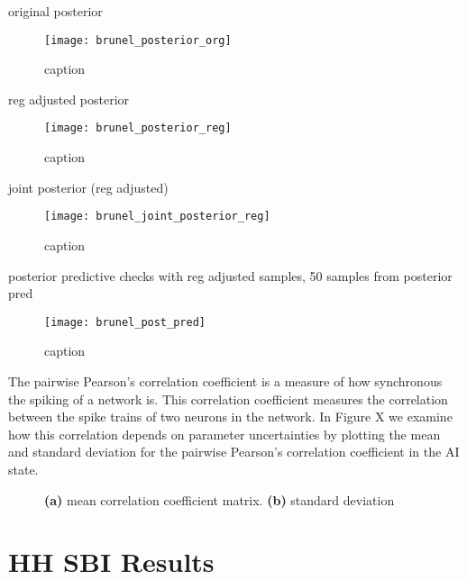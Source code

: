 original posterior

\begin{figure}[H]
    \centering
    \texttt{[image: brunel\_posterior\_org]}
    \caption{caption}
    \label{fig:fig1}
\end{figure}

reg adjusted posterior

\begin{figure}[H]
    \centering
    \texttt{[image: brunel\_posterior\_reg]}
    \caption{caption}
    \label{fig:fig1}
\end{figure}


joint posterior (reg adjusted)

\begin{figure}[H]
    \centering
    \texttt{[image: brunel\_joint\_posterior\_reg]}
    \caption{caption}
    \label{fig:fig1}
\end{figure}

posterior predictive checks with reg adjusted samples, 50 samples from posterior pred

\begin{figure}[H]
    \centering
    \texttt{[image: brunel\_post\_pred]}
    \caption{caption}
    \label{fig:fig1}
\end{figure}

The pairwise Pearson's correlation coefficient is a measure of how synchronous the spiking of a network is. This correlation coefficient measures the correlation between the spike trains of two neurons in the network. In Figure X we examine how this correlation depends on parameter uncertainties by plotting the mean and standard deviation for the pairwise Pearson's correlation coefficient in the AI state.

\begin{figure}[H]
\centering
{}
\qquad
{}
\caption{\textbf{(a)} mean correlation coefficient matrix. \textbf{(b)} standard deviation
}
\label{fig:fig1}
\end{figure}


\section{HH SBI Results}

